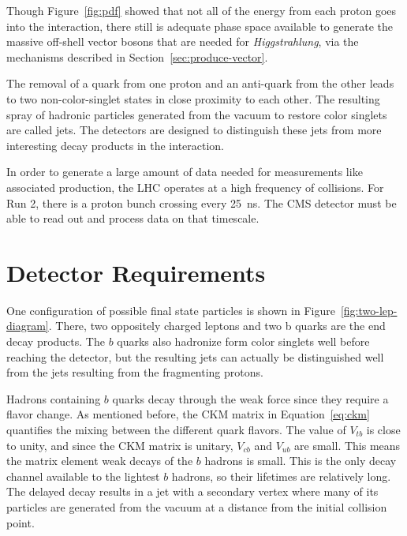 Though Figure~\ref{fig:pdf} showed that not all of the energy from each proton
goes into the interaction,
there still is adequate phase space available to generate the massive off-shell
vector bosons that are needed for \emph{Higgstrahlung},
via the mechanisms described in Section~\ref{sec:produce-vector}.

The removal of a quark from one proton and an anti-quark from the other leads to two
non-color-singlet states in close proximity to each other.
The resulting spray of hadronic particles generated from the vacuum to restore
color singlets are called jets.
The detectors are designed to distinguish these jets from more interesting decay products
in the interaction.

In order to generate a large amount of data needed for measurements like associated production,
the LHC operates at a high frequency of collisions.
For Run 2, there is a proton bunch crossing every \SI{25}{ns}.
The CMS detector must be able to read out and process data on that timescale.

\section{Detector Requirements}

One configuration of possible final state particles is shown in Figure~\ref{fig:two-lep-diagram}.
There, two oppositely charged leptons and two b quarks are the end decay products.
The $b$ quarks also hadronize form color singlets well before reaching the detector,
but the resulting jets can actually be distinguished well from the jets resulting
from the fragmenting protons.

Hadrons containing $b$ quarks decay through the weak force since they require a flavor change.
As mentioned before, the CKM matrix in Equation~\ref{eq:ckm} quantifies the mixing between the different quark flavors.
The value of $V_{tb}$ is close to unity, and since the CKM matrix is unitary,
$V_{cb}$ and $V_{ub}$ are small.
This means the matrix element weak decays of the $b$ hadrons is small.
This is the only decay channel available to the lightest $b$ hadrons,
so their lifetimes are relatively long.
The delayed decay results in a jet with a secondary vertex where many of its particles
are generated from the vacuum at a distance from the initial collision point.

